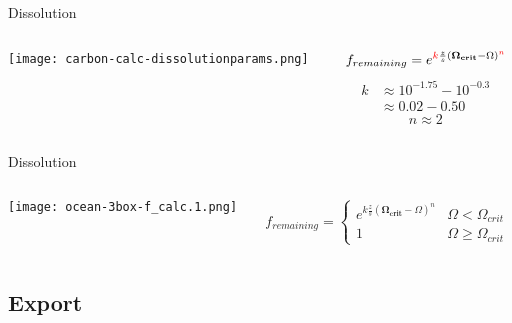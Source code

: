 \begin{frame}{Dissolution}
    \begin{columns}
        \begin{column}{0.45\linewidth}
            \centering
            \texttt{[image: carbon-calc-dissolutionparams.png]}
        \end{column}
        \begin{column}{0.55\linewidth}
            $$f_{remaining} = e^{{\color{red}k} \frac{z}{s} (\mathbf{\Omega_{crit}} - \Omega)^{\color{red}n}}$$
            \begin{align*}
                k & \approx 10^{-1.75} - 10^{-0.3} \\
                & \approx 0.02 - 0.50
            \end{align*}
            $$n \approx 2$$
        \end{column}
    \end{columns}

\end{frame}

\begin{frame}{Dissolution}
    \begin{columns}
        \begin{column}{0.45\linewidth}
            \centering
            \texttt{[image: ocean-3box-f\_calc.1.png]}
        \end{column}
        \begin{column}{0.55\linewidth}
            $$f_{remaining} = \begin{cases}
                e^{k \frac{z}{s} (\mathbf{\Omega_{crit}} - \Omega)^n} & \Omega < \Omega_{crit} \\
                1 & \Omega \geq \Omega_{crit}
            \end{cases}
            $$
        \end{column}
    \end{columns}
\end{frame}

\subsection{Export}

